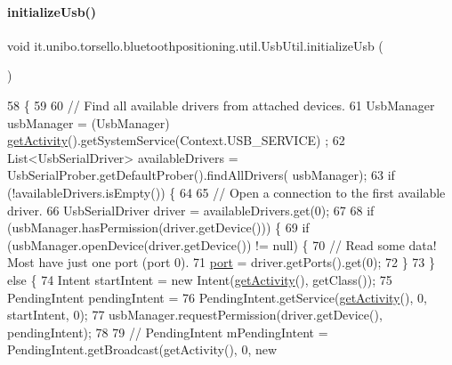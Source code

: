 \paragraph{\texorpdfstring{initialize\+Usb()}{initializeUsb()}}
{\footnotesize\ttfamily void it.\+unibo.\+torsello.\+bluetoothpositioning.\+util.\+Usb\+Util.\+initialize\+Usb (\begin{DoxyParamCaption}{ }\end{DoxyParamCaption})\hspace{0.3cm}{\ttfamily [private]}}


\begin{DoxyCode}
58                                  \{
59 
60         \textcolor{comment}{// Find all available drivers from attached devices.}
61         UsbManager usbManager = (UsbManager) \hyperlink{classit_1_1unibo_1_1torsello_1_1bluetoothpositioning_1_1util_1_1UsbUtil_a625b1885830a4d2c359a534834a46648_a625b1885830a4d2c359a534834a46648}{getActivity}().getSystemService(Context.USB\_SERVICE)
      ;
62         List<UsbSerialDriver> availableDrivers = UsbSerialProber.getDefaultProber().findAllDrivers(
      usbManager);
63         \textcolor{keywordflow}{if} (!availableDrivers.isEmpty()) \{
64 
65             \textcolor{comment}{// Open a connection to the first available driver.}
66             UsbSerialDriver driver = availableDrivers.get(0);
67 
68             \textcolor{keywordflow}{if} (usbManager.hasPermission(driver.getDevice())) \{
69                 \textcolor{keywordflow}{if} (usbManager.openDevice(driver.getDevice()) != null) \{
70                     \textcolor{comment}{// Read some data! Most have just one port (port 0).}
71                     \hyperlink{classit_1_1unibo_1_1torsello_1_1bluetoothpositioning_1_1util_1_1UsbUtil_a49aef08510b6d48d627670d834099c36_a49aef08510b6d48d627670d834099c36}{port} = driver.getPorts().get(0);
72                 \}
73             \} \textcolor{keywordflow}{else} \{
74                 Intent startIntent = \textcolor{keyword}{new} Intent(\hyperlink{classit_1_1unibo_1_1torsello_1_1bluetoothpositioning_1_1util_1_1UsbUtil_a625b1885830a4d2c359a534834a46648_a625b1885830a4d2c359a534834a46648}{getActivity}(), getClass());
75                 PendingIntent pendingIntent =
76                         PendingIntent.getService(\hyperlink{classit_1_1unibo_1_1torsello_1_1bluetoothpositioning_1_1util_1_1UsbUtil_a625b1885830a4d2c359a534834a46648_a625b1885830a4d2c359a534834a46648}{getActivity}(), 0, startIntent, 0);
77                 usbManager.requestPermission(driver.getDevice(), pendingIntent);
78 
79 \textcolor{comment}{//                PendingIntent mPendingIntent = PendingIntent.getBroadcast(getActivity(), 0, new
}
\end{DoxyCode}
